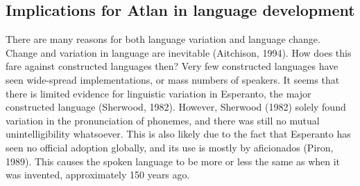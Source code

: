 \subsection{Implications for Atlan in language development}

There are many reasons for both language variation and language change. Change and variation in language are inevitable (Aitchison, 1994). How does this fare against constructed languages then? Very few constructed languages have seen wide-spread implementations, or mass numbers of speakers. It seems that there is limited evidence for linguistic variation in Esperanto, the major constructed language (Sherwood, 1982). However, Sherwood (1982) solely found variation in the pronunciation of phonemes, and there was still no mutual unintelligibility whatsoever. This is also likely due to the fact that Esperanto has seen no official adoption globally, and its use is mostly by aficionados (Piron, 1989). This causes the spoken language to be more or less the same as when it was invented, approximately 150 years ago. 

